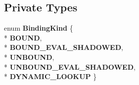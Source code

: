 \subsection*{Private Types}
\begin{DoxyCompactItemize}
\item 
enum {\bfseries Binding\+Kind} \{ \\*
{\bfseries B\+O\+U\+ND}, 
\\*
{\bfseries B\+O\+U\+N\+D\+\_\+\+E\+V\+A\+L\+\_\+\+S\+H\+A\+D\+O\+W\+ED}, 
\\*
{\bfseries U\+N\+B\+O\+U\+ND}, 
\\*
{\bfseries U\+N\+B\+O\+U\+N\+D\+\_\+\+E\+V\+A\+L\+\_\+\+S\+H\+A\+D\+O\+W\+ED}, 
\\*
{\bfseries D\+Y\+N\+A\+M\+I\+C\+\_\+\+L\+O\+O\+K\+UP}
 \}\hypertarget{classv8_1_1internal_1_1_scope_ac0377699b350082cce5e931f1dbfa145}{}\label{classv8_1_1internal_1_1_scope_ac0377699b350082cce5e931f1dbfa145}

\end{DoxyCompactItemize}

